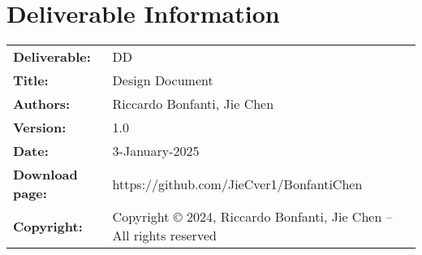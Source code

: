 \documentclass{util/polimi_3i}
\begin{document}


\pagestyle{empty} %
\frontmatter %




\startpreamble %
\setcounter{page}{1} %

\chapter*{Deliverable Information} 
\begin{table}[h!]
    \begin{tabu} to \textwidth { X[0.3,r,p] X[0.7,l,p] }
    \hline
    \textbf{Deliverable:} & DD\\
    \textbf{Title:} & Design Document \\
    \textbf{Authors:} & Riccardo Bonfanti, Jie Chen \\
    \textbf{Version:} & 1.0 \\ 
    \textbf{Date:} & 3-January-2025 \\
    \textbf{Download page:} & https://github.com/JieCver1/BonfantiChen \\
    \textbf{Copyright:} & Copyright © 2024, Riccardo Bonfanti, Jie Chen – All rights reserved \\
    \hline
    \end{tabu}
    \end{table}
    
\end{document}
